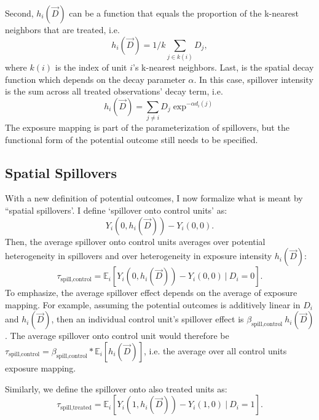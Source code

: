 \documentclass[11pt]{article}
\begin{document}
Second, $h_i(\vec{D})$ can be a function that equals the proportion of the k-nearest neighbors that are treated, i.e. \[
    h_i(\vec{D}) = 1/k \sum_{j \in k(i)} D_j,
\]
where $k(i)$ is the index of unit $i$'s k-nearest neighbors. Last, is the spatial decay function which depends on  the decay parameter $\alpha$. In this case, spillover intensity is the sum across all treated observations' decay term, i.e. \[ 
    h_i(\vec{D}) = \sum_{j \neq i} D_j \exp^{-\alpha d_i(j)}
\] 
The exposure mapping is part of the parameterization of spillovers, but the functional form of the potential outcome still needs to be specified. 



\subsection{Spatial Spillovers}

With a new definition of potential outcomes, I now formalize what is meant by ``spatial spillovers'. I define `spillover onto control units' as: \[
    Y_{i}(0, h_i(\vec{D})) - Y_{i}(0, 0).
\] 
Then, the average spillover onto control units averages over potential heterogeneity in spillovers and over heterogeneity in exposure intensity $h_i(\vec{D})$: \[
    \tau_{\text{spill,control}} = \mathbb{E}_i \left[ Y_{i}(0, h_i(\vec{D})) - Y_{i}(0, 0) \ \vert \ D_i = 0 \right].
\]
To emphasize, the average spillover effect depends on the average of exposure mapping. For example, assuming the potential outcomes is additively linear in $D_i$ and $h_i(\vec{D})$, then an individual control unit's spillover effect is $\beta_{\text{spill,control}} \ h_i(\vec{D})$. The average spillover onto control unit would therefore be $\tau_{\text{spill,control}} = \beta_{\text{spill,control}} * \mathbb{E}_{i} \left[ h_i(\vec{D})\right]$, i.e. the average over all control units exposure mapping.

Similarly, we define the spillover onto also treated units as: \[ 
    \tau_{\text{spill,treated}} = \mathbb{E}_i \left[ Y_{i}(1, h_i(\vec{D})) - Y_{i}(1, 0) \ \vert \ D_i = 1 \right].
\] 
\end{document}
